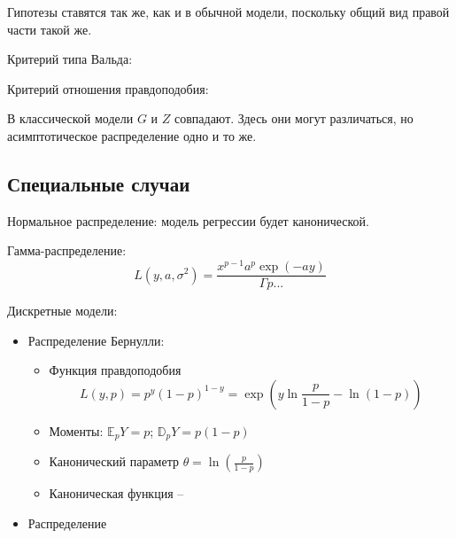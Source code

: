 \documentclass[main.tex]{subfiles}
\begin{document}
Гипотезы ставятся так же, как и в обычной модели, поскольку общий вид правой части такой же.

Критерий типа Вальда:

Критерий отношения правдоподобия:

В классической модели $ G $ и $ Z $ совпадают.
Здесь они могут различаться, но асимптотическое распределение одно и то же.

\subsection{Специальные случаи}

Нормальное распределение: модель регрессии будет канонической.

Гамма-распределение:
\[ L(y,a,\sigma^2) = \frac{ x^{p-1} a^p \exp(-a y) }{ \Gamma p ...} \] %

Дискретные модели:

\begin{itemize}
	\item Распределение Бернулли:
	\begin{itemize}[noitemsep]
		\item Функция правдоподобия
		\[ L(y,p) = p^y (1-p)^{1-y} = \exp \left( y \ln \frac{p}{1-p} - \ln (1-p) \right) \]
		\item Моменты: $ \mathds E_p Y = p $; $ \mathds D_p Y = p(1-p) $
		\item Канонический параметр $ \theta = \ln \left( \frac{p}{1-p} \right) $
		\item Каноническая функция -- 
	\end{itemize}
	\item Распределение 
\end{itemize}
\end{document}
